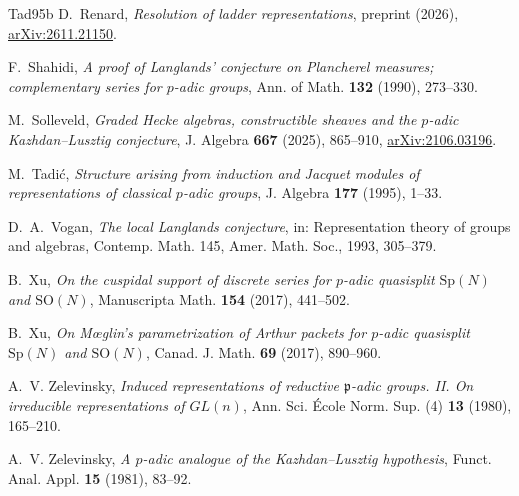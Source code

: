 \documentclass[a4paper,12pt,leqno]{amsart}
\theoremstyle{plain}
\theoremstyle{definition}
\begin{document}
\begin{thebibliography}{Tad95b}
 D.~Renard, \emph{Resolution of ladder representations}, preprint (2026),
\href{https://arxiv.org/abs/2611.21150}{arXiv:2611.21150}.

 F.~Shahidi, \emph{A proof of Langlands' conjecture on Plancherel measures;
complementary series for $p$-adic groups}, Ann. of Math. \textbf{132} (1990), 273--330.

 M.~Solleveld, \emph{Graded Hecke algebras, constructible sheaves and the
$p$-adic Kazhdan--Lusztig conjecture}, J. Algebra \textbf{667} (2025), 865--910,
\href{https://arxiv.org/abs/2106.03196}{arXiv:2106.03196}.

 M.~Tadi\'c, \emph{Structure arising from induction and Jacquet modules of
representations of classical $p$-adic groups}, J. Algebra \textbf{177} (1995), 1--33.

 D.~A.~Vogan, \emph{The local Langlands conjecture}, in: Representation theory of
groups and algebras, Contemp. Math. 145, Amer. Math. Soc., 1993, 305--379.

 B.~Xu, \emph{On the cuspidal support of discrete series for $p$-adic
quasisplit $\mathrm{Sp}(N)$ and $\mathrm{SO}(N)$}, Manuscripta Math. \textbf{154} (2017), 441--502.

 B.~Xu, \emph{On M\oe glin's parametrization of Arthur packets for $p$-adic
quasisplit $\mathrm{Sp}(N)$ and $\mathrm{SO}(N)$}, Canad. J. Math. \textbf{69} (2017), 890--960.

 A.~V. Zelevinsky, \emph{Induced representations of reductive ${\mathfrak
p}$-adic groups. II. On irreducible representations of $GL(n)$}, Ann. Sci. \'Ecole Norm. Sup. (4)
\textbf{13} (1980), 165--210.

 A.~V. Zelevinsky, \emph{A $p$-adic analogue of the Kazhdan--Lusztig
hypothesis}, Funct. Anal. Appl. \textbf{15} (1981), 83--92.

\end{thebibliography}
\end{document}
